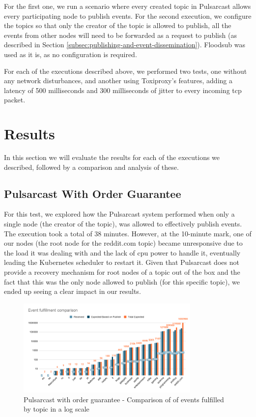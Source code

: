 For the first one, we run a scenario where every created topic in Pulsarcast
allows every participating node to publish events. For the second execution, we
configure the topics so that only the creator of the topic is allowed to
publish, all the events from other nodes will need to be forwarded as a request
to publish (as described in Section
\ref{subsec:publishing-and-event-dissemination}).  Floodsub was used as it is,
as no configuration is required. 

For each of the executions described above, we performed two tests, one without
any network disturbances, and another using Toxiproxy's features, adding a
latency of 500 milliseconds and 300 milliseconds of jitter to every incoming
\acrshort{tcp} packet. 

\section{Results}\label{results}

In this section we will evaluate the results for each of the executions we
described, followed by a comparison and analysis of these.

\subsection{Pulsarcast With Order Guarantee}\label{subsec:pulsarcast-with-order-guarantee}

For this test, we explored how the Pulsarcast system performed when only a
single node (the creator of the topic), was allowed to effectively publish
events. The execution took a total of 38 minutes. However, at the 10-minute
mark, one of our nodes (the root node for the reddit.com topic) became
unresponsive due to the load it was dealing with and the lack of \acrshort{cpu} power to
handle it, eventually leading the Kubernetes scheduler to restart it.  Given
that Pulsarcast does not provide a recovery mechanism for root nodes of a topic
out of the box and the fact that this was the only node allowed to publish (for
this specific topic), we ended up seeing a clear impact in our results.

\begin{figure}[!htb]
  \centering
  \includegraphics[width=0.8\textwidth]{img/graph-pulsarcast-order-event-fulfillment-comparison.png}
  \caption{Pulsarcast with order guarantee - Comparison of of events fulfilled by topic in a log scale}
  \label{fig:graph-pulsarcast-order-event-fulfillment-comparison}
\end{figure}

